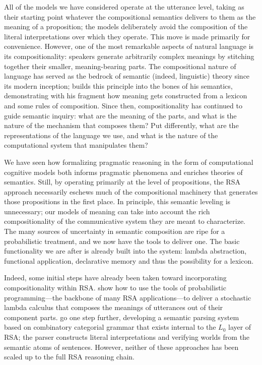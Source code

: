 \documentclass{sp}
\begin{document}
All of the models we have considered operate at the utterance level, taking as their starting point whatever the compositional semantics delivers to them as the meaning of a proposition; the models deliberately avoid the composition of the literal interpretations over which they operate. This move is made primarily for convenience. However, one of the most remarkable aspects of natural language is its compositionality: speakers generate arbitrarily complex meanings by stitching together their smaller, meaning-bearing parts. The compositional nature of language has served as the bedrock of semantic (indeed, linguistic) theory since its modern inception; \cite{montague1973} builds this principle into the bones of his semantics, demonstrating with his fragment how meaning gets constructed from a lexicon and some rules of composition. Since then, compositionality has continued to guide semantic inquiry: what are the meaning of the parts, and what is the nature of the mechanism that composes them? Put differently, what are the representations of the language we use, and what is the nature of the computational system that manipulates them? 

We have seen how formalizing pragmatic reasoning in the form of computational cognitive models both informs pragmatic phenomena and enriches theories of semantics. Still, by operating primarily at the level of propositions, the RSA approach necessarily eschews much of the compositional machinery that generates those propositions in the first place. In principle, this semantic leveling is unnecessary; our models of meaning can take into account the rich compositionality of the communicative system they are meant to characterize. The many sources of uncertainty in semantic composition are ripe for a probabilistic treatment, and we now have the tools to deliver one. The basic functionality we are after is already built into the system: lambda abstraction, functional application, declarative memory and thus the possibility for a lexicon.

Indeed, some initial steps have already been taken toward incorporating compositionality within RSA. \cite{goodmanlassiter2015handbook} show how to use the tools of probabilistic programming---the backbone of many RSA applications---to deliver a stochastic lambda calculus that composes the meanings of utterances out of their component parts. \cite{goodmanstuhlmuller2014} go one step further, developing a semantic parsing system based on combinatory categorial grammar that exists internal to the $L_0$ layer of RSA; the parser constructs literal interpretations and verifying worlds from the semantic atoms of sentences. However, neither of these approaches has been scaled up to the full RSA reasoning chain.
\end{document}
